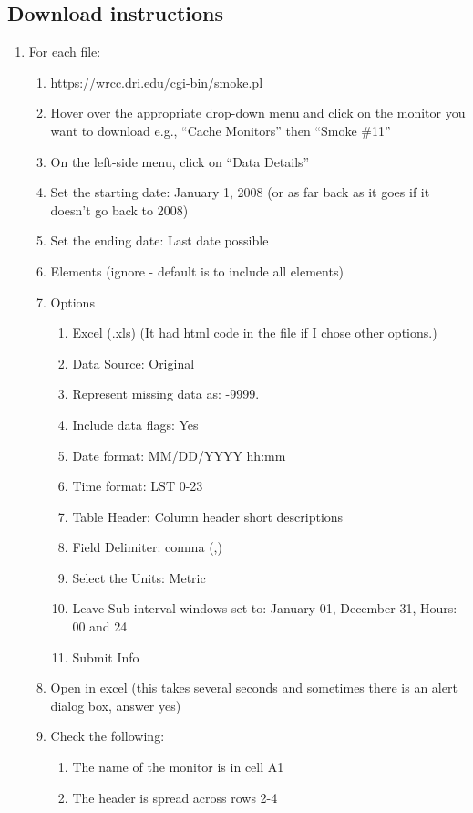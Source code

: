 \subsection*{Download instructions}
\begin{enumerate}
\item For each file:
\begin{enumerate}[nolistsep]
\item \url{https://wrcc.dri.edu/cgi-bin/smoke.pl}
\item Hover over the appropriate drop-down menu and click on the monitor you want to download e.g., “Cache Monitors” then “Smoke \#11”
\item On the left-side menu, click on ``Data Details”
\item Set the starting date: January 1, 2008 (or as far back as it goes if it doesn’t go back to 2008)
\item Set the ending date: Last date possible%
\item Elements (ignore - default is to include all elements)
\item Options
\begin{enumerate}[nolistsep]
\item Excel (.xls) (It had html code in the file if I chose other options.)
\item Data Source: Original
\item Represent missing data as: -9999.
\item Include data flags: Yes
\item Date format: MM/DD/YYYY hh:mm
\item Time format: LST 0-23
\item Table Header: Column header short descriptions
\item Field Delimiter: comma (,)
\item Select the Units: Metric
\item Leave Sub interval windows set to: January 01, December 31, Hours: 00 and 24
\item Submit Info
\end{enumerate}
\item Open in excel (this takes several seconds and sometimes there is an alert dialog box, answer yes)
\item Check the following:
\begin{enumerate}[nolistsep]
\item The name of the monitor is in cell A1
\item The header is spread across rows 2-4

\end{enumerate}
\end{enumerate}
\end{enumerate}
